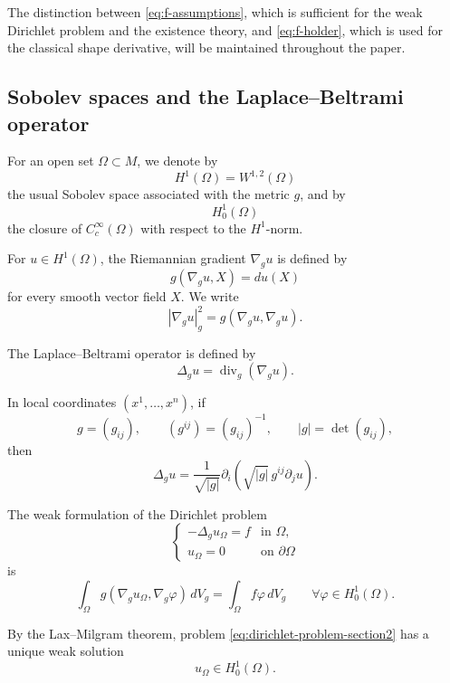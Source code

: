\documentclass{article}
\begin{document}
The distinction between \eqref{eq:f-assumptions}, which is sufficient
for the weak Dirichlet problem and the existence theory, and
\eqref{eq:f-holder}, which is used for the classical shape derivative,
will be maintained throughout the paper.

\subsection{Sobolev spaces and the Laplace--Beltrami operator}
\label{subsec:sobolev-laplace}

For an open set $\Omega\subset M$, we denote by
\[
H^1(\Omega)=W^{1,2}(\Omega)
\]
the usual Sobolev space associated with the metric $g$, and by
\[
H_0^1(\Omega)
\]
the closure of $C_c^\infty(\Omega)$ with respect to the $H^1$-norm.

For $u\in H^1(\Omega)$, the Riemannian gradient $\nabla_g u$ is defined
by
\[
g(\nabla_g u,X)=du(X)
\]
for every smooth vector field $X$. We write
\[
|\nabla_g u|_g^2
=
g(\nabla_g u,\nabla_g u).
\]

The Laplace--Beltrami operator is defined by
\[
\Delta_g u
=
\operatorname{div}_g(\nabla_g u).
\]

In local coordinates $(x^1,\ldots,x^n)$, if
\[
g=(g_{ij}),
\qquad
(g^{ij})=(g_{ij})^{-1},
\qquad
|g|=\det(g_{ij}),
\]
then
\begin{equation}
\Delta_g u
=
\frac{1}{\sqrt{|g|}}
\partial_i
\left(
\sqrt{|g|}\,g^{ij}\partial_j u
\right).
\label{eq:laplace-beltrami-local}
\end{equation}

The weak formulation of the Dirichlet problem
\begin{equation}
\begin{cases}
-\Delta_g u_\Omega=f & \text{in }\Omega,\\
u_\Omega=0 & \text{on }\partial\Omega
\end{cases}
\label{eq:dirichlet-problem-section2}
\end{equation}
is
\begin{equation}
\int_\Omega
g(\nabla_g u_\Omega,\nabla_g\varphi)\,dV_g
=
\int_\Omega f\varphi\,dV_g
\qquad
\forall\varphi\in H_0^1(\Omega).
\label{eq:weak-dirichlet}
\end{equation}

By the Lax--Milgram theorem, problem
\eqref{eq:dirichlet-problem-section2} has a unique weak solution
\[
u_\Omega\in H_0^1(\Omega).
\]
\end{document}
